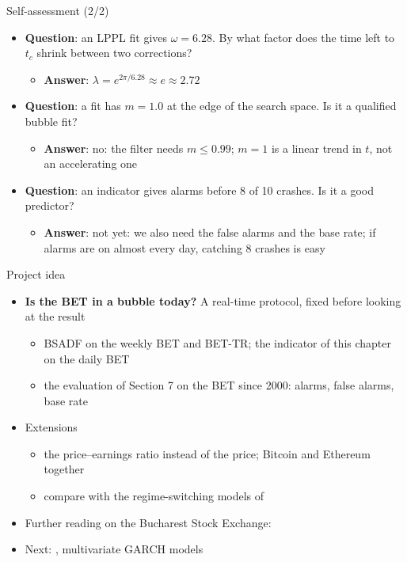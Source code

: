 \begin{frame}{Self-assessment (2/2)}
\itemsize{\small}
\begin{itemize}
    \item \textbf{Question}: an LPPL fit gives $\omega = 6.28$. By what factor does the time left to $t_c$ shrink between two corrections?
    \begin{itemize}
        \item \textbf{Answer}: $\lambda = e^{2\pi/6.28} \approx e \approx 2.72$
    \end{itemize}
    \item \textbf{Question}: a fit has $m = 1.0$ at the edge of the search space. Is it a qualified bubble fit?
    \begin{itemize}
        \item \textbf{Answer}: no: the filter needs $m \le 0.99$; $m = 1$ is a linear trend in $t$, not an accelerating one
    \end{itemize}
    \item \textbf{Question}: an indicator gives alarms before 8 of 10 crashes. Is it a good predictor?
    \begin{itemize}
        \item \textbf{Answer}: not yet: we also need the false alarms and the base rate; if alarms are on almost every day, catching 8 crashes is easy
    \end{itemize}
\end{itemize}
\end{frame}

\begin{frame}{Project idea}
\itemsize{\small}
\begin{itemize}
    \item \textbf{Is the BET in a bubble today?} A real-time protocol, fixed before looking at the result
    \begin{itemize}
        \item BSADF on the weekly BET and BET-TR; the indicator of this chapter on the daily BET
        \item the evaluation of Section 7 on the BET since 2000: alarms, false alarms, base rate
    \end{itemize}
    \item Extensions
    \begin{itemize}
        \item the price--earnings ratio instead of the price; Bitcoin and Ethereum together
        \item compare with the regime-switching models of 
    \end{itemize}
    \item Further reading on the Bucharest Stock Exchange: 
    \item Next: , multivariate GARCH models
\end{itemize}
\end{frame}



